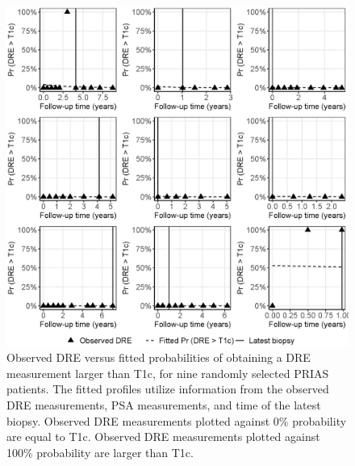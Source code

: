 \begin{figure}[!htb]
\centerline{\includegraphics[width=\columnwidth]{images/fitted_9subject_dre.eps}}
\caption{Observed DRE versus fitted probabilities of obtaining a DRE measurement larger than T1c, for nine randomly selected PRIAS patients. The fitted profiles utilize information from the observed DRE measurements, PSA measurements, and time of the latest biopsy. Observed DRE measurements plotted against 0\% probability are equal to T1c. Observed DRE measurements plotted against 100\% probability are larger than T1c.}
\label{fig:fitted_9subject_dre}
\end{figure}

